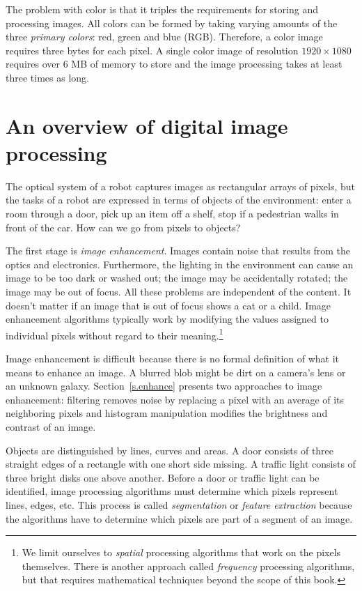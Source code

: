 The problem with color is that it triples the requirements for storing and processing images. All colors can be formed by taking varying amounts of the three \emph{primary colors}: red, green and blue (RGB). Therefore, a color image requires three bytes for each pixel. A single color image of resolution $1920\times 1080$ requires over $6$ MB of memory to store and the image processing takes at least three times as long.

\section{An overview of digital image processing}\label{s.image-overview}

The optical system of a robot captures images as rectangular arrays of pixels, but the tasks of a robot are expressed in terms of objects of the environment: enter a room through a door, pick up an item off a shelf, stop if a pedestrian walks in front of the car. How can we go from pixels to objects?

The first stage is \emph{image enhancement}. Images contain noise that results from the optics and electronics. Furthermore, the lighting in the environment can cause an image to be too dark or washed out; the image may be accidentally rotated; the image may be out of focus. All these problems are independent of the content. It doesn't matter if an image that is out of focus shows a cat or a child. Image enhancement algorithms typically work by modifying the values assigned to individual pixels without regard to their meaning.\footnote{We limit ourselves to \emph{spatial} processing algorithms that work on the pixels themselves. There is another approach called \emph{frequency} processing algorithms, but that requires mathematical techniques beyond the scope of this book.}

Image enhancement is difficult because there is no formal definition of what it means to enhance an image. A blurred blob might be dirt on a camera's lens or an unknown galaxy. Section~\ref{s.enhance} presents two approaches to image enhancement: filtering removes noise by replacing a pixel with an average of its neighboring pixels and histogram manipulation modifies the brightness and contrast of an image.

Objects are distinguished by lines, curves and areas. A door consists of three straight edges of a rectangle with one short side missing. A traffic light consists of three bright disks one above another. Before a door or traffic light can be identified, image processing algorithms must determine which pixels represent lines, edges, etc. This process is called \emph{segmentation} or \emph{feature extraction} because the algorithms have to determine which pixels are part of a segment of an image.

